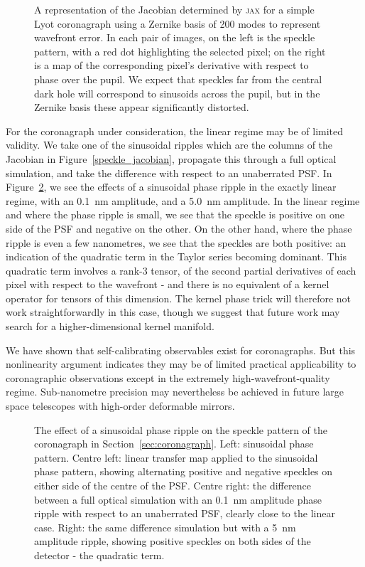\documentclass[modern]{aastex63}
\begin{document}
\begin{figure}
\caption{A representation of the Jacobian determined by \textsc{jax} for a simple Lyot coronagraph using a Zernike basis of 200 modes to represent wavefront error. In each pair of images, on the left is the speckle pattern, with a red dot highlighting the selected pixel; on the right is a map of the corresponding pixel's derivative with respect to phase over the pupil. We expect that speckles far from the central dark hole will correspond to sinusoids across the pupil, but in the Zernike basis these appear significantly distorted. \label{speckle_jacobian_zernike}}
\end{figure}

For the coronagraph under consideration, the linear regime may be of limited validity. We take one of the sinusoidal ripples which are the columns of the Jacobian in Figure~\ref{speckle_jacobian}, propagate this through a full optical simulation, and take the difference with respect to an unaberrated PSF. In Figure~\ref{corona_nonlinearity}, we see the effects of a sinusoidal phase ripple in the exactly linear regime, with an 0.1~nm amplitude, and a 5.0~nm amplitude. In the linear regime and where the phase ripple is small, we see that the speckle is positive on one side of the PSF and negative on the other. On the other hand, where the phase ripple is even a few nanometres, we see that the speckles are both positive: an indication of the quadratic term in the Taylor series becoming dominant. This quadratic term involves a rank-3 tensor, of the second partial derivatives of each pixel with respect to the wavefront - and there is no equivalent of a kernel operator for tensors of this dimension. The kernel phase trick will therefore not work straightforwardly in this case, though we suggest that future work may search for a higher-dimensional kernel manifold. 

We have shown that self-calibrating observables exist for coronagraphs. But this nonlinearity argument indicates they may be of limited practical applicability to coronagraphic observations except in the extremely high-wavefront-quality regime. Sub-nanometre precision may nevertheless be achieved in future large space telescopes with high-order deformable mirrors.


\begin{figure}
\caption{The effect of a sinusoidal phase ripple on the speckle pattern of the coronagraph in Section~\ref{sec:coronagraph}. Left: sinusoidal phase pattern. Centre left: linear transfer map applied to the sinusoidal phase pattern, showing alternating positive and negative speckles on either side of the centre of the PSF. Centre right: the difference between a full optical simulation with an 0.1~nm amplitude phase ripple with respect to an unaberrated PSF, clearly close to the linear case. Right: the same difference simulation but with a 5~nm amplitude ripple, showing positive speckles on both sides of the detector - the quadratic term. \label{corona_nonlinearity}}
\end{figure}
\end{document}
